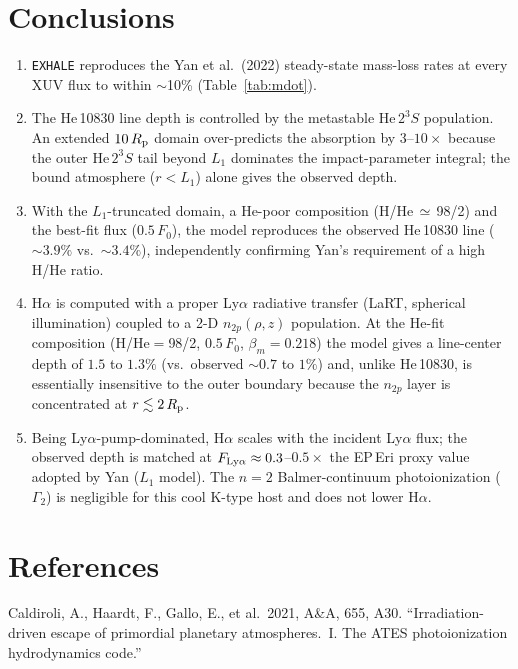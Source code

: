 \documentclass[english,a4paper]{kiseon_memo}
\newcommand{\Rp}{R_{\rm p}}
\newcommand{\Fo}{F_{0}}
\newcommand{\HeTS}{\mathrm{He}\,2^{3}S}
\begin{document}
\section{Conclusions}
\begin{enumerate}
\item \texttt{EXHALE} reproduces the Yan et al.\ (2022) steady-state mass-loss
  rates at every XUV flux to within $\sim$10\% (Table~\ref{tab:mdot}).
\item The He\,10830 line depth is controlled by the metastable $\HeTS$ population.
  An extended $10\,\Rp$ domain over-predicts the absorption by $3$--$10\times$
  because the outer $\HeTS$ tail beyond $L_1$ dominates the impact-parameter
  integral; the bound atmosphere ($r<L_1$) alone gives the observed depth.
\item With the $L_1$-truncated domain, a He-poor composition (H/He\,$\simeq$\,98/2)
  and the best-fit flux ($0.5\,\Fo$), the model reproduces the observed He\,10830
  line ($\sim\!3.9\%$ vs.\ $\sim\!3.4\%$), independently confirming Yan's requirement
  of a high H/He ratio.
\item H$\alpha$ is computed with a proper Ly$\alpha$ radiative transfer (LaRT,
  spherical illumination) coupled to a 2-D $n_{2p}(\rho,z)$ population.  At the
  He-fit composition (H/He$=$98/2, $0.5\,\Fo$, $\beta_m=0.218$) the model gives a
  line-center depth of $1.5$ to $1.3\%$ (vs.\ observed $\sim\!0.7$ to $1\%$) and, unlike
  He\,10830, is essentially insensitive to the outer boundary because the
  $n_{2p}$ layer is concentrated at $r\lesssim2\,\Rp$.
\item Being Ly$\alpha$-pump-dominated, H$\alpha$ scales with the incident
  Ly$\alpha$ flux; the observed depth is matched at
  $F_{\rm Ly\alpha}\approx0.3$--$0.5\times$ the EP\,Eri proxy value adopted by Yan
  ($L_1$ model).  The $n=2$ Balmer-continuum photoionization ($\Gamma_2$) is
  negligible for this cool K-type host and does not lower H$\alpha$.
\end{enumerate}

\section*{References}
\begingroup
\setlength{\parindent}{0pt}\setlength{\parskip}{4pt}
Caldiroli, A., Haardt, F., Gallo, E., et al.\ 2021, A\&A, 655, A30.
``Irradiation-driven escape of primordial planetary atmospheres.~I. The ATES
photoionization hydrodynamics code.''
\end{document}
